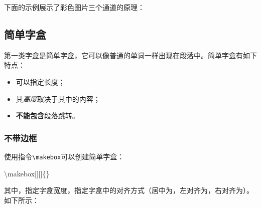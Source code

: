 下面的示例展示了彩色图片三个通道的原理：

\begin{center}
  \settowidth{\tmplength}{字字字字}
  \hspace{-3em}%
  \hspace{-3em}%
\end{center}

\subsection{简单字盒}

第一类字盒是简单字盒，它可以像普通的单词一样出现在段落中。简单字盒有如下特点：

\begin{itemize}
  \item 可以指定长度；
  \item 其\emph{高度}取决于其中的内容；
  \item \textbf{不能包含}段落跳转。
\end{itemize}

\subsubsection{不带边框}
使用指令\verb|\makebox|可以创建简单字盒：

\begin{dmd}
\backslash makebox[][]\{\}
\end{dmd}

其中，指定字盒宽度，指定字盒中的对齐方式（居中为，左对齐为，右对齐为）。如下所示：

